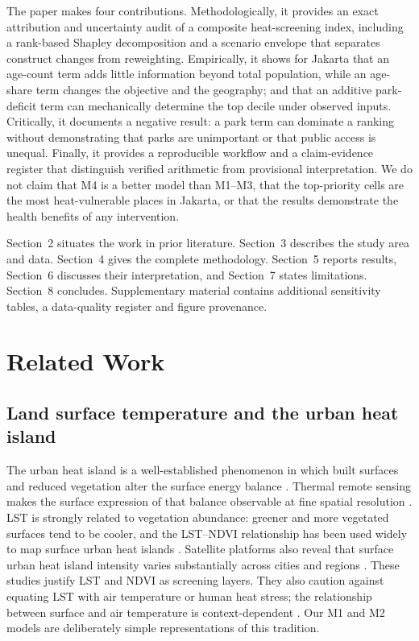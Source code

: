 \documentclass[times,twoside]{_Templates/MultiTargetManuscript}
\begin{document}
The paper makes four contributions. Methodologically, it provides an exact
attribution and uncertainty audit of a composite heat-screening index, including
a rank-based Shapley decomposition and a scenario envelope that separates
construct changes from reweighting. Empirically, it shows for Jakarta that an
age-count term adds little information beyond total population, while an
age-share term changes the objective and the geography; and that an additive
park-deficit term can mechanically determine the top decile under observed
inputs. Critically, it documents a negative result: a park term can dominate a
ranking without demonstrating that parks are unimportant or that public access
is unequal. Finally, it provides a reproducible workflow and a claim-evidence
register that distinguish verified arithmetic from provisional interpretation.
We do not claim that M4 is a better model than M1--M3, that the top-priority
cells are the most heat-vulnerable places in Jakarta, or that the results
demonstrate the health benefits of any intervention.

Section~2 situates the work in prior literature. Section~3 describes the study
area and data. Section~4 gives the complete methodology. Section~5 reports
results, Section~6 discusses their interpretation, and Section~7 states
limitations. Section~8 concludes. Supplementary material contains additional
sensitivity tables, a data-quality register and figure provenance.

\section{Related Work}

\subsection{Land surface temperature and the urban heat island}

The urban heat island is a well-established phenomenon in which built surfaces
and reduced vegetation alter the surface energy balance \citep{oke1982}. Thermal
remote sensing makes the surface expression of that balance observable at fine
spatial resolution \citep{voogt2003}. LST is strongly related to vegetation
abundance: greener and more vegetated surfaces tend to be cooler, and the
LST--NDVI relationship has been used widely to map surface urban heat islands
\citep{weng2004,peng2012,estoque2017}. Satellite platforms also reveal that
surface urban heat island intensity varies substantially across cities and
regions \citep{peng2012,zhou2019}. These studies justify LST and NDVI as
screening layers. They also caution against equating LST with air temperature or
human heat stress; the relationship between surface and air temperature is
context-dependent \citep{schwarz2012}. Our M1 and M2 models are deliberately
simple representations of this tradition.
\end{document}
